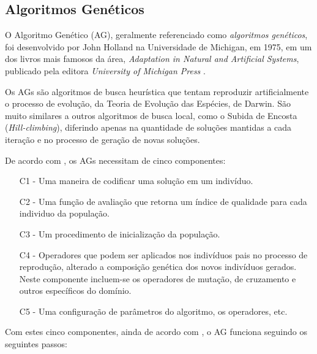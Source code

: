 \documentclass[12pt]{article}
\begin{document}
\subsection{Algoritmos Genéticos}

\par O Algoritmo Genético (AG), geralmente referenciado como \emph{algoritmos genéticos}, foi desenvolvido por John Holland na Universidade de Michigan, em 1975, em um dos livros mais famosos da área, \emph{Adaptation in Natural and Artificial Systems}, publicado pela editora \emph{University of Michigan Press} \cite{essentials:pop}.
\par Os AGs são algoritmos de busca heurística que tentam reproduzir artificialmente o processo de evolução, da Teoria de Evolução das Espécies, de Darwin. São muito similares a outros algoritmos de busca local, como o Subida de Encosta (\textit{Hill-climbing}), diferindo apenas na quantidade de soluções mantidas a cada iteração e no processo de geração de novas soluções.
\par De acordo com \cite{montana}, os AGs necessitam de cinco componentes:
\begin{enumerate}
\item[C1] - Uma maneira de codificar uma solução em um indivíduo.
\item[C2] - Uma função de avaliação que retorna um índice de qualidade para cada individuo da população.
\item[C3] - Um procedimento de inicialização da população.
\item[C4] - Operadores que podem ser aplicados nos indivíduos pais no processo de reprodução, alterado a composição genética dos novos indivíduos gerados. Neste componente incluem-se os operadores de mutação, de cruzamento e outros específicos do domínio.
\item[C5] - Uma configuração de parâmetros do algoritmo, os operadores, etc.
\end{enumerate}
Com estes cinco componentes, ainda de acordo com \cite{montana}, o AG funciona seguindo os seguintes passos:
\end{document}
